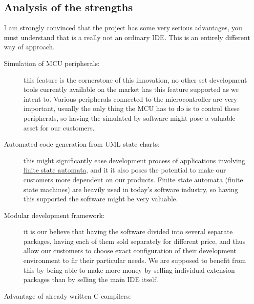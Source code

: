 \documentclass[a4paper,twoside,15pt]{book}
\begin{document}
        \subsection{Analysis of the strengths}
            I am strongly convinced that the project has some very serious advantages, you must understand that is a really not an ordinary IDE. This is an entirely different way of approach.
             \begin{description}
                \item[Simulation of MCU peripherals:]
                    this feature is the cornerstone of this innovation, no other set development tools currently available on the market has this feature supported as we intent to. Various peripherals connected to the microcontroller are very important, usually the only thing the MCU has to do is to control these peripherals, so having the simulated by software might pose a valuable asset for our customers.
                \item[Automated code generation from UML state charts:]
                    this might significantly ease development process of applications \href{http://en.wikipedia.org/wiki/Finite-state_machine}{involving finite state automata}, and it it also poses the potential to make our customers more dependent on our products. Finite state automata (finite state machines) are heavily used in today's software industry, so having this supported the software might be very valuable.
                \item[Modular development framework:]
                    it is our believe that having the software divided into several separate packages, having each of them sold separately for different price, and thus allow our customers to choose exact configuration of their development environment to fir their particular needs. We are supposed to benefit from this by being able to make more money by selling individual extension packages than by selling the main IDE itself.
                \item[Advantage of already written C compilers:]

\end{description}
\end{document}
